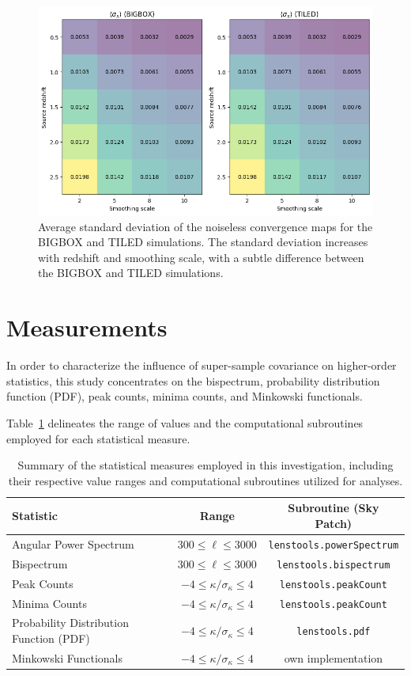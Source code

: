 \begin{figure}[ht]
    \centering
    \includegraphics[width=\textwidth]{figures/avg_sigma0.png}
    \caption[Average standard deviation of the noiseless convergence maps]{Average standard deviation of the noiseless convergence maps for the BIGBOX and TILED simulations. The standard deviation increases with redshift and smoothing scale, with a subtle difference between the BIGBOX and TILED simulations.} \label{fig:avg_sigma0}
\end{figure}

\section{Measurements}
In order to characterize the influence of super-sample covariance on higher-order statistics, this study concentrates on the bispectrum, probability distribution function (PDF), peak counts, minima counts, and Minkowski functionals. 

Table~\ref{tab:statistics} delineates the range of values and the computational subroutines employed for each statistical measure. 
\begin{table}[htbp]
    \centering
    \begin{tabular}{lcc}
    \toprule
    \textbf{Statistic} & \textbf{Range} & \textbf{Subroutine (Sky Patch)} \\
    \midrule
    Angular Power Spectrum & $300 \leq \ell \leq 3000$ & \texttt{lenstools.powerSpectrum} \\
    Bispectrum & $300 \leq \ell \leq 3000$ & \texttt{lenstools.bispectrum} \\
    Peak Counts & $-4 \leq \kappa/\sigma_\kappa \leq 4$ & \texttt{lenstools.peakCount} \\
    Minima Counts & $-4 \leq \kappa/\sigma_\kappa \leq 4$ & \texttt{lenstools.peakCount} \\
    Probability Distribution Function (PDF) & $-4 \leq \kappa/\sigma_\kappa \leq 4$ & \texttt{lenstools.pdf} \\
    Minkowski Functionals & $-4 \leq \kappa/\sigma_\kappa \leq 4$ & own implementation \\
    \bottomrule
    \end{tabular}
    \caption{Summary of the statistical measures employed in this investigation, including their respective value ranges and computational subroutines utilized for analyses.}\label{tab:statistics}
\end{table}

